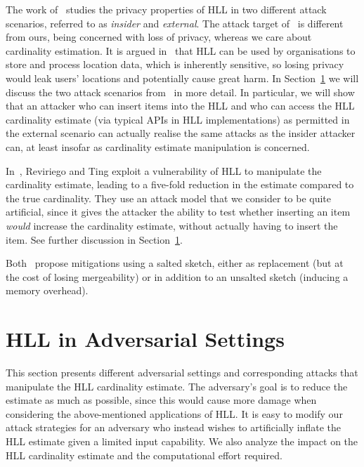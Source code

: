 \documentclass{IEEEtran}
\begin{document}
The work of~\cite{cardestprivacy} studies the privacy properties of HLL in two different attack scenarios, referred to as \emph{insider} and \emph{external}. The attack target of~\cite{cardestprivacy} is different from ours, being concerned with loss of privacy, whereas we care about cardinality estimation. It is argued in~\cite{cardestprivacy} that HLL can be used by organisations to store and process location data, which is inherently sensitive, so losing privacy would leak users' locations and potentially cause great harm. In Section~\ref{sec:attacks} we will discuss the two attack scenarios from~\cite{cardestprivacy} in more detail. In particular, we will show that an attacker who can insert items into the HLL and who can access the HLL cardinality estimate (via typical APIs in HLL implementations) as permitted in the external scenario can actually realise the same attacks as the insider attacker can, at least insofar as cardinality estimate manipulation is concerned. 

In~\cite{hllvuln}, Reviriego and Ting exploit a vulnerability of HLL to manipulate the cardinality estimate, leading to a five-fold reduction in the estimate compared to the true cardinality. They use an attack model that we consider to be quite artificial, since it gives the attacker the ability to test whether inserting an item \emph{would} increase the cardinality estimate, without actually having to insert the item. See further discussion in Section~\ref{sec:attacks}.

Both~\cite{cardestprivacy,hllvuln} propose mitigations using a salted sketch, either as replacement (but at the cost of losing mergeability) or in addition to an unsalted sketch (inducing a memory overhead). 

\section{HLL in Adversarial Settings}\label{sec:attacks}

This section presents different adversarial settings and corresponding attacks that manipulate the HLL cardinality estimate. The adversary's goal is to reduce the estimate as much as possible, since this would cause more damage when  considering the above-mentioned applications of HLL. It is easy to modify our attack strategies for an adversary who instead wishes to artificially inflate the HLL estimate given a limited input capability. We also analyze the impact on the HLL cardinality estimate and the computational effort required. 
\end{document}
